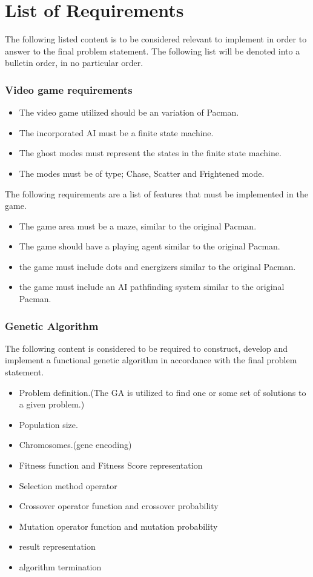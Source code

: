 \section{List of Requirements} \label{sec:lor}

The following listed content is to be considered relevant to implement in order to answer to the final problem statement. The following list will be denoted into a bulletin order, in no particular order.

\subsubsection{Video game requirements}

\begin{itemize}
\item The video game utilized should be an variation of Pacman.
\item The incorporated AI must be a finite state machine.
\item The ghost modes must represent the states in the finite state machine.
\item The modes must be of type; Chase, Scatter and Frightened mode.
\end{itemize}


The following requirements are a list of features that must be implemented in the game.

\begin{itemize}
\item The game area must be a maze, similar to the original Pacman.
\item The game should have a playing agent similar to the original Pacman.
\item the game must include dots and energizers similar to the original Pacman.
\item the game must include an AI pathfinding system similar to the original Pacman.
\end{itemize}


\subsubsection{Genetic Algorithm}
The following content is considered to be required to construct, develop and implement a functional genetic algorithm in accordance with the final problem statement.


\begin{itemize}
\item Problem definition.(The GA is utilized to find one or some set of solutions to a given problem.)
\item Population size.
\item Chromosomes.(gene encoding)
\item Fitness function and Fitness Score representation
\item Selection method operator
\item Crossover operator function and crossover probability
\item Mutation operator function and mutation probability
\item result representation
\item algorithm termination
\end{itemize}


